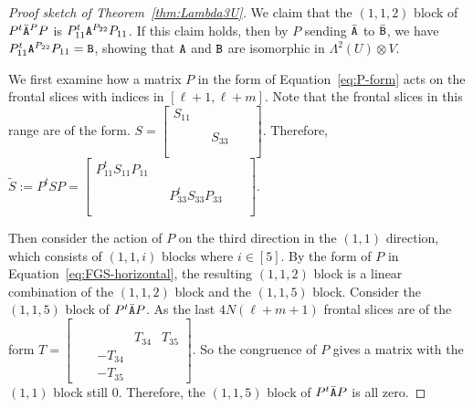 \begin{proof}[Proof sketch of Theorem~\ref{thm:Lambda3U}]
We claim that the $(1, 1, 2)$ block of $P^t\bar{\mathtt{A}}^P P$ is $P_{11}^t\mathtt{A}^{P_{22}}P_{11}$. If this claim holds, then by $P$ sending $\bar{\mathtt{A}}$ to $\bar{\mathtt{B}}$, we have $P_{11}^t\mathtt{A}^{P_{22}}P_{11}=\mathtt{B}$, showing that $\mathtt{A}$ and $\mathtt{B}$ are isomorphic in $\Lambda^2(U)\otimes V$.

We first examine how a matrix $P$ in the form of Equation~\ref{eq:P-form} acts on the frontal slices with indices in $[\ell+1, \ell+m]$. Note that the frontal slices in this range are of the form. 
$S=\begin{bmatrix}
	S_{11} & & & & \\
	& & & & \\
	& & S_{33} & & \\
	& & & & \\
	& & & & 
\end{bmatrix}$. Therefore, $\tilde S:=P^tSP=\begin{bmatrix}
P_{11}^tS_{11}P_{11} & & & & \\
& & & & \\
& & P_{33}^tS_{33}P_{33} & & \\
& & & & \\
& & & & 
\end{bmatrix}$. 

Then consider the action of $P$ on the third direction in the $(1, 1)$ direction, which consists of $(1, 1, i)$ blocks where $i\in[5]$. By the form of $P$ in Equation~\ref{eq:FGS-horizontal}, the resulting $(1, 1, 2)$ block is a linear combination of the $(1, 1, 2)$ block and the $(1, 1, 5)$ block. Consider the $(1, 1, 5)$ block of $P^t\bar{\mathtt{A}} P$. As the last $4N(\ell+m+1)$ frontal slices are of the form $T=\begin{bmatrix}
	& & & & \\
	& & & & \\
	& & & T_{34} & T_{35}\\
	& & -T_{34}& & \\
	& & -T_{35}& & 
\end{bmatrix}$. So the congruence of $P$ gives a matrix with the $(1, 1)$ block still $0$. Therefore, the $(1, 1, 5)$ block of $P^t\bar{\mathtt{A}} P$ is all zero. 


\end{proof}
